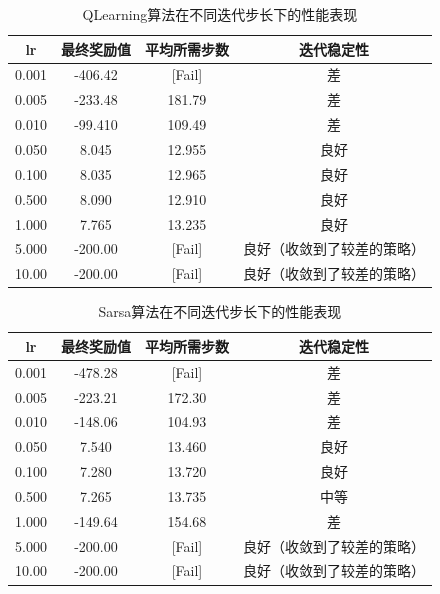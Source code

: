 \documentclass[12pt, a4paper]{article}
\begin{document}
\begin{enumerate}
        \begin{table}[htbp]
        \caption{QLearning算法在不同迭代步长下的性能表现}
        \centering
        \begin{tabular}{cccc}
            \toprule
            lr    & 最终奖励值 & 平均所需步数 & 迭代稳定性 \\
            \midrule
            0.001 &  -406.42  &   [Fail]    &     差     \\
            0.005 &  -233.48  &   181.79    &     差     \\
            0.010 &  -99.410  &   109.49    &     差     \\
            0.050 &   8.045   &   12.955    &     良好   \\
            0.100 &   8.035   &   12.965    &     良好   \\
            0.500 &   8.090   &   12.910    &     良好   \\
            1.000 &   7.765   &   13.235    &     良好   \\
            5.000 &  -200.00  &   [Fail]    &     良好（收敛到了较差的策略）\\
            10.00 &  -200.00  &   [Fail]    &     良好（收敛到了较差的策略）\\
        \end{tabular}
        \end{table}

        \begin{table}[htbp]
        \caption{Sarsa算法在不同迭代步长下的性能表现}
        \centering
        \begin{tabular}{cccc}
            \toprule
            lr    & 最终奖励值 & 平均所需步数 & 迭代稳定性 \\
            \midrule
            0.001 &  -478.28  &   [Fail]    &    差      \\
            0.005 &  -223.21  &   172.30    &    差      \\
            0.010 &  -148.06  &   104.93    &    差      \\
            0.050 &   7.540   &   13.460    &    良好    \\
            0.100 &   7.280   &   13.720    &    良好    \\
            0.500 &   7.265   &   13.735    &    中等    \\
            1.000 &  -149.64  &   154.68    &    差      \\
            5.000 &  -200.00  &   [Fail]    &    良好（收敛到了较差的策略）\\
            10.00 &  -200.00  &   [Fail]    &    良好（收敛到了较差的策略）\\
        \end{tabular}
        \end{table}


\end{enumerate}
\end{document}
